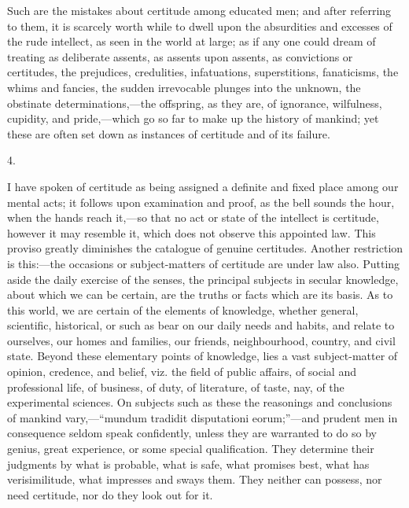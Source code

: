 Such are the mistakes about certitude among educated men; and after
referring to them, it is scarcely worth while to dwell upon the
absurdities and excesses of the rude intellect, as seen in the world
at large; as if any one could dream of treating as deliberate assents,
as assents upon assents, as convictions or certitudes, the
prejudices, credulities, infatuations, superstitions, fanaticisms, the
whims and fancies, the sudden irrevocable plunges into the unknown,
the obstinate determinations,—the offspring, as they are, of
ignorance, wilfulness, cupidity, and pride,—which go so far to make
up the history of mankind; yet these are often set down as instances
of certitude and of its failure.

4.

I have spoken of certitude as being assigned a definite and fixed
place among our mental acts; it follows upon examination and proof, as
the bell sounds the hour, when the hands reach it,—so that no act or
state of the intellect is certitude, however it may resemble it, which
does not observe this appointed law. This proviso greatly diminishes
the catalogue of genuine certitudes. Another restriction is this:—the
occasions or subject-matters of certitude are under law also. Putting
aside the daily exercise of the senses, the principal subjects in
secular knowledge, about which we can be certain, are the truths or
facts which are its basis. As to this world, we are certain of the
elements of knowledge, whether general, scientific, historical, or
such as bear on our daily needs and habits, and relate to ourselves,
our homes and families, our friends, neighbourhood, country, and civil
state. Beyond these elementary points of knowledge, lies a vast
subject-matter of opinion, credence, and belief, viz. the field of
public affairs, of social and professional life, of business, of duty,
of literature, of taste, nay, of the experimental sciences. On
subjects such as these the reasonings and conclusions of mankind vary,—``mundum
tradidit disputationi eorum;''—and prudent men in consequence
seldom speak confidently, unless they are warranted to do so by
genius, great experience, or some special qualification. They
determine their judgments by what is probable, what is safe, what
promises best, what has verisimilitude, what impresses and sways them.
They neither can possess, nor need certitude, nor do they look out for
it.

